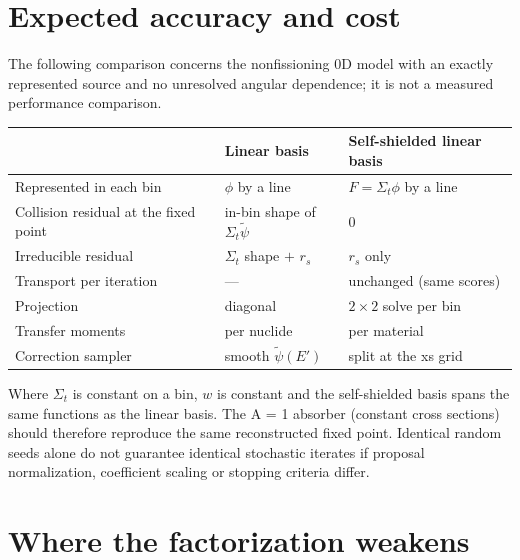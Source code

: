 \documentclass[11pt]{article}
\newcommand{\tpsi}{\tilde\psi}
\newcommand{\Sigt}{\Sigma_t}
\begin{document}
\section{Expected accuracy and cost}

The following comparison concerns the nonfissioning 0D model with an exactly
represented source and no unresolved angular dependence; it is not a measured
performance comparison.

\begin{center}
\begin{tabular}{lll}
\toprule
 & Linear basis & Self-shielded linear basis \\
\midrule
Represented in each bin & $\phi$ by a line & $F = \Sigt\phi$ by a line \\
Collision residual at the fixed point & in-bin shape of $\Sigt\tpsi$ & 0 \\
Irreducible residual & $\Sigt$ shape $+$ $r_s$ & $r_s$ only \\
Transport per iteration & --- & unchanged (same scores) \\
Projection & diagonal & $2\times2$ solve per bin \\
Transfer moments & per nuclide & per material \\
Correction sampler & smooth $\tpsi(E')$ & split at the xs grid \\
\bottomrule
\end{tabular}
\end{center}

\noindent Where $\Sigt$ is constant on a bin, $w$ is constant and the self-shielded
basis spans the same functions as the linear basis. The A = 1 absorber (constant
cross sections) should therefore reproduce the same reconstructed fixed point.
Identical random seeds alone do not guarantee identical stochastic iterates if
proposal normalization, coefficient scaling or stopping criteria differ.

\section{Where the factorization weakens}
\end{document}
